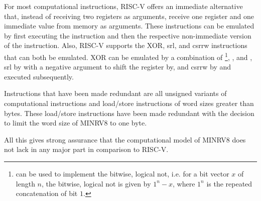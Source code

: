For most computational instructions, RISC-V offers an immediate alternative that, instead of receiving two registers as arguments, receive one register and one immediate value from memory as arguments.
These instructions can be emulated by first executing the  instruction and then the respective non-immediate version of the instruction.
Also, RISC-V supports the XOR, \gls{srl}, and \gls{csrrw} instructions that can both be emulated.
XOR can be emulated by a combination of \footnote{%
     can be used to implement the bitwise, logical not, i.e. for a bit vector $ x $ of length $ n $, the bitwise, logical not is given by $ 1^n - x $, where $ 1^n $ is the repeated concatenation of bit $ 1 $.
}, , and , \gls{srl} by  with a negative argument to shift the register by, and \gls{csrrw} by  and  executed subsequently.

Instructions that have been made redundant are all unsigned variants of computational instructions and load/store instructions of word sizes greater than bytes.
These load/store instructions have been made redundant with the decision to limit the word size of MINRV8 to one byte.

All this gives strong assurance that the computational model of MINRV8 does not lack in any major part in comparison to RISC-V.

